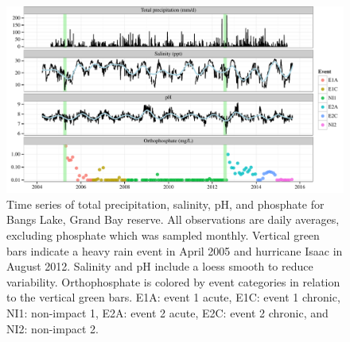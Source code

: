 \documentclass[letterpaper,12pt]{article}\usepackage[]{graphicx}\usepackage[]{color}
\begin{document}
\setcounter{figure}{1}
\setcounter{table}{1}

\begin{landscape}
\centering\vspace*{\fill}
\begin{figure}[!ht]

{\centering \includegraphics[width=1.3\textwidth]{figs/tsplot-1} 

}

\caption[Time series of total precipitation, salinity, pH, and phosphate for Bangs Lake, Grand Bay reserve]{Time series of total precipitation, salinity, pH, and phosphate for Bangs Lake, Grand Bay reserve.  All observations are daily averages, excluding phosphate which was sampled monthly.  Vertical green bars indicate a heavy rain event in April 2005 and hurricane Isaac in August 2012.  Salinity and pH include a loess smooth to reduce variability. Orthophosphate is colored by event categories in relation to the vertical green bars.  E1A: event 1 acute, E1C: event 1 chronic, NI1: non-impact 1, E2A: event 2 acute, E2C: event 2 chronic, and NI2: non-impact 2.}\label{fig:tsplot}
\end{figure}


\end{landscape}
\clearpage
\end{document}
